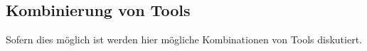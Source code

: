 \subsection{Kombinierung von Tools}\label{kombinierung}

Sofern dies möglich ist werden hier mögliche Kombinationen von Tools diskutiert.
